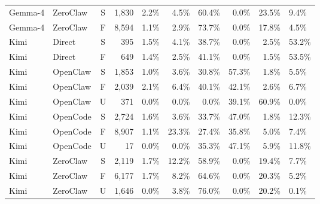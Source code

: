 \begin{table}[t]
\begin{tabular}{@{}llcrrrrrr@{}}
  Gemma-4 & ZeroClaw & S & 1,830 & 2.2\% & 4.5\% & 60.4\% & 0.0\% & 23.5\% & 9.4\% \\
  Gemma-4 & ZeroClaw & F & 8,594 & 1.1\% & 2.9\% & 73.7\% & 0.0\% & 17.8\% & 4.5\% \\
\midrule
  Kimi & Direct & S & 395 & 1.5\% & 4.1\% & 38.7\% & 0.0\% & 2.5\% & 53.2\% \\
  Kimi & Direct & F & 649 & 1.4\% & 2.5\% & 41.1\% & 0.0\% & 1.5\% & 53.5\% \\
  Kimi & OpenClaw & S & 1,853 & 1.0\% & 3.6\% & 30.8\% & 57.3\% & 1.8\% & 5.5\% \\
  Kimi & OpenClaw & F & 2,039 & 2.1\% & 6.4\% & 40.1\% & 42.1\% & 2.6\% & 6.7\% \\
  Kimi & OpenClaw & U & 371 & 0.0\% & 0.0\% & 0.0\% & 39.1\% & 60.9\% & 0.0\% \\
  Kimi & OpenCode & S & 2,724 & 1.6\% & 3.6\% & 33.7\% & 47.0\% & 1.8\% & 12.3\% \\
  Kimi & OpenCode & F & 8,907 & 1.1\% & 23.3\% & 27.4\% & 35.8\% & 5.0\% & 7.4\% \\
  Kimi & OpenCode & U & 17 & 0.0\% & 0.0\% & 35.3\% & 47.1\% & 5.9\% & 11.8\% \\
  Kimi & ZeroClaw & S & 2,119 & 1.7\% & 12.2\% & 58.9\% & 0.0\% & 19.4\% & 7.7\% \\
  Kimi & ZeroClaw & F & 6,177 & 1.7\% & 8.2\% & 64.6\% & 0.0\% & 20.3\% & 5.2\% \\
  Kimi & ZeroClaw & U & 1,646 & 0.0\% & 3.8\% & 76.0\% & 0.0\% & 20.2\% & 0.1\% \\
\bottomrule
\end{tabular}
\vspace{-14pt}
\end{table}

